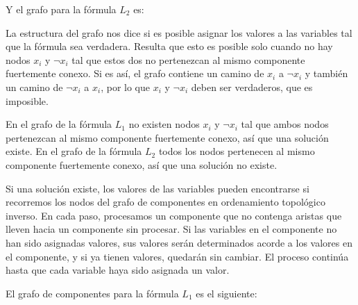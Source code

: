 Y el grafo para la fórmula $L_2$ es:

\begin{center}
\end{center}

La estructura del grafo nos dice si es posible asignar los valores
a las variables tal que la fórmula sea verdadera. Resulta
que esto es posible solo cuando no hay nodos $x_i$ y $\lnot x_i$
tal que estos dos no pertenezcan al mismo componente fuertemente conexo.
Si es así, el grafo contiene un camino de $x_i$ a
$\lnot x_i$ y también un camino de $\lnot x_i$ a $x_i$, por lo que
$x_i$ y $\lnot x_i$ deben ser verdaderos, que es imposible.

En el grafo de la fórmula $L_1$ no existen nodos $x_i$ y $\lnot x_i$
tal que ambos nodos pertenezcan al mismo componente fuertemente conexo,
así que una solución existe. En el grafo de la fórmula $L_2$ todos los
nodos pertenecen al mismo componente fuertemente conexo, así que una
solución no existe.

Si una solución existe, los valores de las variables pueden encontrarse
si recorremos los nodos del grafo de componentes en ordenamiento
topológico inverso. En cada paso, procesamos un componente que no
contenga aristas que lleven hacia un componente sin procesar.
Si las variables en el componente no han sido asignadas valores,
sus valores serán determinados acorde a los valores en el componente,
y si ya tienen valores, quedarán sin cambiar. El proceso continúa hasta
que cada variable haya sido asignada un valor.

\newpage
El grafo de componentes para la fórmula $L_1$ es el siguiente:
\begin{center}
\end{center}

